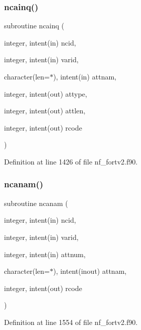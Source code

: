 \mbox{\label{nf__fortv2_8f90_a7b0621bf96d56601f68c18da4ff2e759}} 
\subsubsection{\texorpdfstring{ncainq()}{ncainq()}}
{\footnotesize\ttfamily subroutine ncainq (\begin{DoxyParamCaption}\item[{integer, intent(in)}]{ncid,  }\item[{integer, intent(in)}]{varid,  }\item[{character(len=$\ast$), intent(in)}]{attnam,  }\item[{integer, intent(out)}]{attype,  }\item[{integer, intent(out)}]{attlen,  }\item[{integer, intent(out)}]{rcode }\end{DoxyParamCaption})}



Definition at line 1426 of file nf\+\_\+fortv2.\+f90.

\mbox{\label{nf__fortv2_8f90_abd5c8126f5ad1171b3944262956899b0}} 
\subsubsection{\texorpdfstring{ncanam()}{ncanam()}}
{\footnotesize\ttfamily subroutine ncanam (\begin{DoxyParamCaption}\item[{integer, intent(in)}]{ncid,  }\item[{integer, intent(in)}]{varid,  }\item[{integer, intent(in)}]{attnum,  }\item[{character(len=$\ast$), intent(inout)}]{attnam,  }\item[{integer, intent(out)}]{rcode }\end{DoxyParamCaption})}



Definition at line 1554 of file nf\+\_\+fortv2.\+f90.

\mbox{\label{nf__fortv2_8f90_a7572a6d6e1628e2868cef69a3d147c38}} 
